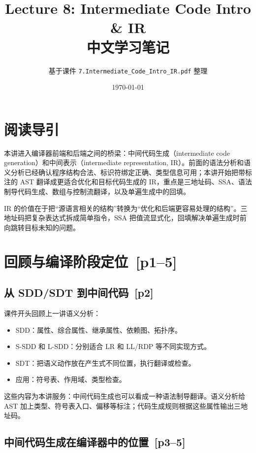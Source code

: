\documentclass[UTF8,fontset=none,11pt]{ctexart}
\title{\bfseries Lecture 8: Intermediate Code Intro \& IR\\中文学习笔记}
\author{基于课件 \texttt{7.Intermediate\_Code\_Intro\_IR.pdf} 整理}
\date{\today}
\newenvironment{notebox}[1][]{%
  \par\medskip\noindent{\color{noterule}\rule{\linewidth}{1.1pt}}\par\nopagebreak
  \noindent{\bfseries\color{noterule}#1}\par\nopagebreak\smallskip}%
  {\par\nopagebreak\smallskip\noindent{\color{noterule}\rule{\linewidth}{0.4pt}}\par\medskip}
\newcommand{\pg}[1]{\texorpdfstring{{\small\color{graytext}\,[p#1]}}{ [p#1]}}
\begin{document}
\maketitle
\tableofcontents
\newpage

\section*{阅读导引}

本讲进入编译器前端和后端之间的桥梁：中间代码生成（intermediate code generation）和中间表示（intermediate representation, IR）。前面的语法分析和语义分析已经确认程序结构合法、标识符绑定正确、类型信息可用；本讲开始把带标注的 AST 翻译成更适合优化和目标代码生成的 IR，重点是三地址码、SSA、语法制导代码生成、数组与控制流翻译，以及单遍生成中的回填。

\begin{notebox}[本讲主线]
IR 的价值在于把“源语言相关的结构”转换为“优化和后端更容易处理的结构”。三地址码把复杂表达式拆成简单指令，SSA 把值流显式化，回填解决单遍生成时前向跳转目标未知的问题。
\end{notebox}

\section{回顾与编译阶段定位 \pg{1--5}}

\subsection{从 SDD/SDT 到中间代码 \pg{2}}

课件开头回顾上一讲语义分析：

\begin{itemize}
  \item SDD：属性、综合属性、继承属性、依赖图、拓扑序。
  \item S-SDD 和 L-SDD：分别适合 LR 和 LL/RDP 等不同实现方式。
  \item SDT：把语义动作放在产生式不同位置，执行翻译或检查。
  \item 应用：符号表、作用域、类型检查。
\end{itemize}

这些内容为本讲服务：中间代码生成也可以看成一种语法制导翻译。语义分析给 AST 加上类型、符号表入口、偏移等标注；代码生成规则根据这些属性输出三地址码。

\subsection{中间代码生成在编译器中的位置 \pg{3--5}}
\end{document}
